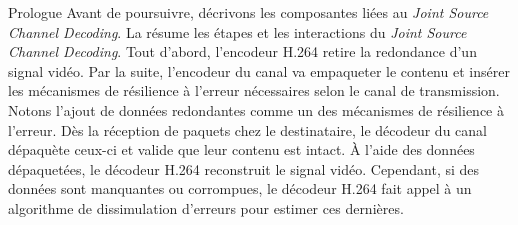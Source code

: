 \begin{section}{Prologue}
Avant de poursuivre, décrivons les composantes liées au \textit{Joint Source
Channel Decoding}. La  résume les étapes et les
interactions du \textit{Joint Source Channel Decoding}. Tout d'abord, l'encodeur
H.264 retire la redondance d'un signal vidéo. Par la suite, l'encodeur du canal
va empaqueter le contenu et insérer les mécanismes de résilience à l'erreur
nécessaires selon le canal de transmission. Notons l'ajout de données
redondantes comme un des mécanismes de résilience à l'erreur. Dès la réception
de paquets chez le destinataire, le décodeur du canal dépaquète ceux-ci et
valide que leur contenu est intact. À l'aide des données dépaquetées, le
décodeur H.264 reconstruit le signal vidéo. Cependant, si des données sont
manquantes ou corrompues, le décodeur H.264 fait appel à un algorithme de
dissimulation d'erreurs pour estimer ces dernières.
\end{section}

